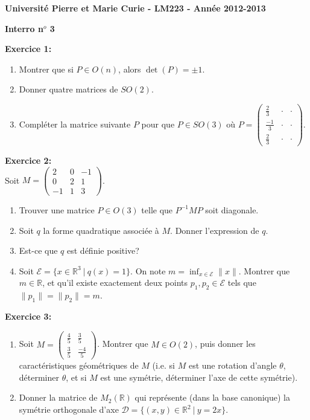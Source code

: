 \documentclass[a4paper, 11pt]{article}
\theoremstyle{plain}
\newcommand{\R}{\mathbb{R}}
\begin{document}
\noindent
\large
\textbf{Universit\'e Pierre et Marie Curie 
 - LM223 -
Ann\'ee 2012-2013}\\

\begin{center}
\Large
\textbf{Interro n$^o$ 3}
\end{center}
\normalsize

\medskip
\noindent
\textbf{Exercice 1:}\\
\begin{enumerate}
\item
Montrer que si $P\in O(n)$, alors $\det (P) = \pm 1$. 

\item Donner quatre matrices de $SO(2)$.

\item 
Compléter la matrice suivante $P$ pour que $P \in SO(3)$ 
où
$P = 
\begin{pmatrix}
\frac{2}{3} & \cdot & \cdot \\[3pt]
\frac{-1}{3} & \cdot & \cdot \\[3pt]
\frac{2}{3} & \cdot & \cdot 
\end{pmatrix}$.

\end{enumerate}

\bigskip
\noindent
\textbf{Exercice 2:}\\
Soit 
$M = 
\begin{pmatrix}
2&0&-1\\
0&2&1\\
-1&1&3
\end{pmatrix}
$. 
\begin{enumerate}
\item 
Trouver une matrice $P\in O(3)$ telle que 
$P^{-1}MP$ soit diagonale.
\item Soit $q$ la forme quadratique associée à $M$. Donner l'expression de $q$.
\item Est-ce que $q$ est définie positive? 
\item Soit $\mathcal{E} = \{ x\in \R^3 \ \big| \ q(x)=1\}$. 
On note $\displaystyle m= \inf_{x\in \mathcal{E}} \|x\|$. Montrer que $m\in \R$, et qu'il existe exactement deux points $p_1, p_2\in \mathcal{E}$ tels que 
$\|p_1\| = \|p_2\| = m$. 
\end{enumerate}
\medskip
\noindent
\textbf{Exercice 3:}\\
\begin{enumerate}
\item 
Soit $M = 
\begin{pmatrix}
\frac{4}{5} & \frac{3}{5} \\[3pt]
\frac{3}{5} & \frac{-4}{5}
\end{pmatrix}$.
Montrer que $M\in O(2)$, puis donner les caractéristiques géométriques de $M$ 
(i.e. si $M$ est une rotation d'angle $\theta$, déterminer $\theta$, et si $M$ est une symétrie, déterminer 
l'axe de cette symétrie).
\item 
Donner la matrice de 
$M_2(\R)$ qui représente (dans la base canonique) la symétrie orthogonale d'axe 
$\mathcal{D} = \{ (x,y) \in \R^2 \ \big| \ y=2x \}$.

\end{enumerate}
\end{document}
